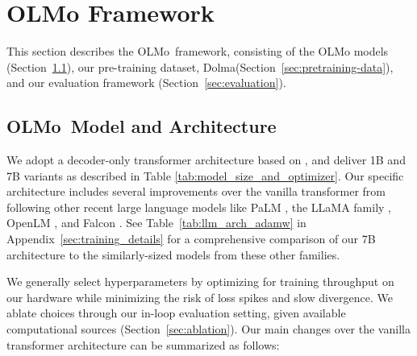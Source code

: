 \documentclass[11pt]{article}
\newcommand{\dolma}{Dolma\xspace}
\newcommand{\olmo}{OLMo\xspace}
\begin{document}

\section{\olmo Framework}
This section describes the \olmo~framework, consisting of the \olmo models (Section~\ref{sec:olmo-arch}), our pre-training dataset, \dolma (Section~\ref{sec:pretraining-data}), and our evaluation framework (Section~\ref{sec:evaluation}). 

\subsection{\olmo~Model and Architecture}\label{sec:olmo-arch}

We adopt a decoder-only transformer architecture based on \cite{vaswani2017attention},
and deliver 1B and 7B variants as described in Table \ref{tab:model_size_and_optimizer}.
Our specific architecture includes several improvements over the vanilla transformer from \cite{vaswani2017attention} following other recent large language models 
like PaLM \citep{chowdhery2022palm}, the LLaMA family \citep{touvron2023llama1, touvron2023llama2}, OpenLM \citep{open_lm}, and Falcon \citep{Falcon}.
See Table~\ref{tab:llm_arch_adamw} in Appendix~\ref{sec:training_details}  for a comprehensive comparison of our 7B architecture to the similarly-sized models from these other families.


We generally select hyperparameters by optimizing  for training throughput on our hardware while minimizing the risk of loss spikes and slow divergence. We ablate choices through our in-loop evaluation setting, given available computational sources (Section~\ref{sec:ablation}).  
Our main changes over the vanilla transformer architecture can be summarized as follows:
\end{document}

